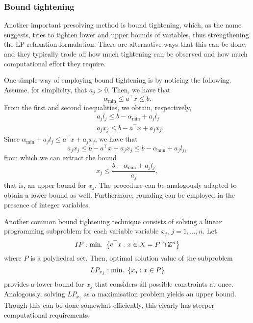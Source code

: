 \subsubsection{Bound tightening}

Another important presolving method is bound tightening, which, as the name suggests, tries to tighten lower and upper bounds of variables, thus strengthening the LP relaxation formulation. There are alternative ways that this can be done, and they typically trade off how much tightening can be observed and how much computational effort they require. 

One simple way of employing bound tightening is by noticing the following. Assume, for simplicity, that $a_j > 0$. Then, we have that
%
\begin{equation*}
	\alpha_{\text{min}} \le a^\top x \le b.
\end{equation*}
%
From the first and second inequalities, we obtain, respectively,
\begin{align*}
	& a_jl_j \le b - \alpha_{\text{min}} + a_jl_j \\
	& a_jx_j \le b - a^\top x + a_jx_j.  
\end{align*}
%
Since $\alpha_{\text{min}} + a_jl_j \le a^\top x + a_jx_j$, we have that
\begin{equation*}
	 a_jx_j \le b - a^\top x + a_jx_j \le b - \alpha_{\text{min}} + a_jl_j,
\end{equation*}
%
from which we can extract the bound
%
\begin{equation*}
	x_j \leq \frac{b - \alpha_{\text{min}} + a_jl_j}{a_j},
\end{equation*}
%
that is, an upper bound for $x_j$. The procedure can be analogously adapted to obtain a lower bound as well. Furthermore, rounding can be employed in the presence of integer variables. 

Another common bound tightening technique consists of solving a linear programming subproblem for each variable variable $x_j$, $j =1, \dots, n$. Let
%
\begin{equation*}
	IP : \mathop{\text{min.~}} \left\{ c^\top x : x \in X = P \cap \mathbb{Z}^n \right \}		
\end{equation*}
%
where $P$ is a polyhedral set. Then, optimal solution value of the subproblem
%
\begin{equation*}
	LP_{x_j} : \mathop{\text{min.~}} \left\{ x_j : x \in P \right \}		
\end{equation*}
%
provides a lower bound for $x_j$ that considers all possible constraints at once. Analogously, solving $LP_{x_j}$ as a maximisation problem yields an upper bound. Though this can be done somewhat efficiently, this clearly has steeper computational requirements. 

